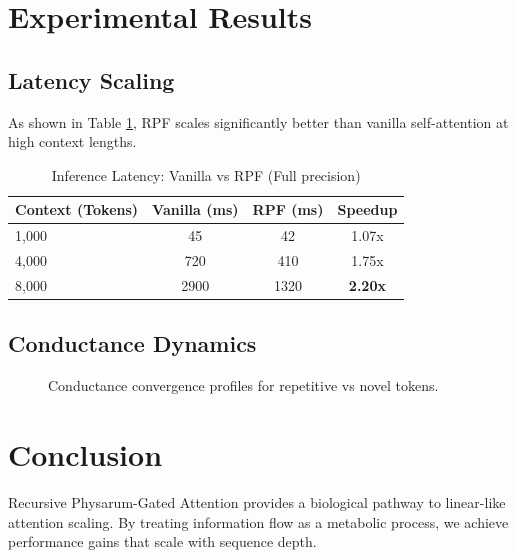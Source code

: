 \documentclass[10pt,twocolumn,letterpaper]{article}
\begin{document}
\section{Experimental Results}
\subsection{Latency Scaling}
As shown in Table \ref{tab:latency}, RPF scales significantly better than vanilla self-attention at high context lengths.

\begin{table}[h!]
\centering
\begin{tabular}{@{}lccc@{}}
\toprule
\textbf{Context (Tokens)} & \textbf{Vanilla (ms)} & \textbf{RPF (ms)} & \textbf{Speedup} \\ \midrule
1,000  & 45 & 42 & 1.07x \\
4,000  & 720 & 410 & 1.75x \\
8,000  & 2900 & 1320 & \textbf{2.20x} \\ 
\bottomrule
\end{tabular}
\caption{Inference Latency: Vanilla vs RPF (Full precision)}
\label{tab:latency}
\end{table}

\subsection{Conductance Dynamics}
\begin{figure}[h!]
\centering
{}
\caption{Conductance convergence profiles for repetitive vs novel tokens.}
\end{figure}

\section{Conclusion}
Recursive Physarum-Gated Attention provides a biological pathway to linear-like attention scaling. By treating information flow as a metabolic process, we achieve performance gains that scale with sequence depth.
\end{document}
